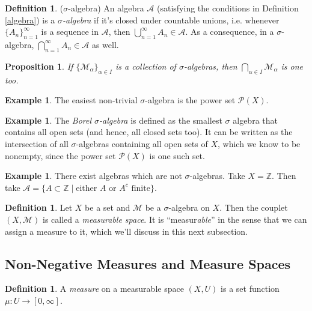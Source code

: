 \documentclass[12pt]{article}
\theoremstyle{plain}
\newtheorem{prop}[thm]{Proposition}
\theoremstyle{definition}
\newtheorem{defn}[thm]{Definition}
\newtheorem{ex}[thm]{Example}
\theoremstyle{remark}
\begin{document}
\begin{defn} 
($\sigma$-algebra)
An algebra $\mathscr{A}$ (satisfying the conditions in Definition \ref{algebra}) is a \emph{$\sigma$-algebra} if it's closed under countable unions,  i.e. whenever $\{A_n\}^\infty_{n=1}$ is a sequence in $\mathscr{A}$, then $\bigcup^\infty_{n=1} A_n \in \mathscr{A}$. As a consequence, in a $\sigma$-algebra, $\bigcap^\infty_{n=1} A_n \in \mathscr{A}$ as well.
\end{defn}

\begin{prop}
If $\{\mathscr{M}_\alpha\}_{\alpha\in I}$ is a collection of $\sigma$-algebras, then $\bigcap_{\alpha\in I} \mathscr{M}_\alpha$ is one too.
\end{prop}

\begin{ex}
The easiest non-trivial $\sigma$-algebra is the power set $\mathscr{P}(X)$.
\end{ex}

\begin{ex}
The \emph{Borel $\sigma$-algebra} is defined as the smallest $\sigma$ algebra that contains all open sets (and hence, all closed sets too). It can be written as the intersection of all $\sigma$-algebras containing all open sets of $X$, which we know to be nonempty, since the power set $\mathscr{P}(X)$ is one such set.
\end{ex}

\begin{ex}
There exist algebras which are not $\sigma$-algebras. Take $X=\mathbb{Z}$. Then take $\mathscr{A} = \{A\subset \mathbb{Z} \; |\; \text{either $A$ or $A^c$ finite}\}$. 
\end{ex}

\begin{defn} 
Let $X$ be a set and $\mathscr{M}$ be a $\sigma$-algebra on $X$. Then the couplet $(X, \mathscr{M})$ is called a \emph{measurable space}. It is ``measur\emph{able}'' in the sense that we can assign a measure to it, which we'll discuss in this next subsection.
\end{defn}



\subsection{Non-Negative Measures and Measure Spaces}

\begin{defn} 
A \emph{measure} on a measurable space $(X,U)$ is a set function $\mu: U \rightarrow [0,\infty]$.
\end{defn}
\end{document}
